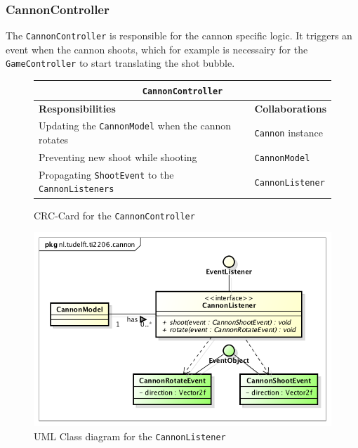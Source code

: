 \documentclass[a4paper]{article}
\begin{document}
\subsubsection*{CannonController}
The \texttt{CannonController} is responsible for the cannon specific logic. It triggers an event when the cannon shoots, which for example is necessairy for the \texttt{GameController} to start translating the shot bubble.

\begin{figure}[H]
    \begin{center}
    \begin{tabular}{ | p{8cm} | p{4cm} | }
      \multicolumn{2}{c}{\texttt{CannonController}} \\ \hline
      \textbf{Responsibilities} & \textbf{Collaborations} \\ \hline
      Updating the \texttt{CannonModel} when the cannon rotates & \texttt{Cannon} instance \\
      Preventing new shoot while shooting & \texttt{CannonModel} \\
      Propagating \texttt{ShootEvent} to the \texttt{CannonListeners} & \texttt{CannonListener} \\
      \hline
    \end{tabular}
    \end{center}
    \caption{CRC-Card for the \texttt{CannonController}}
\end{figure}

\begin{figure}[H]
    \centering
    \includegraphics[scale=0.5]{CannonListener.png}
    \caption{UML Class diagram for the \texttt{CannonListener}}
\end{figure}
\end{document}
